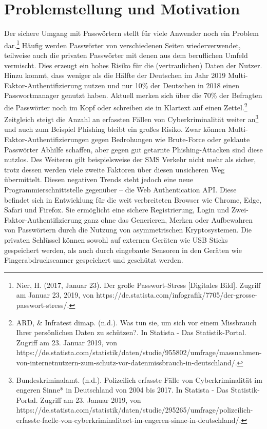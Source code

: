 \chapter{Problemstellung und Motivation}

Der sichere Umgang mit Passwörtern stellt für viele Anwender noch ein Problem dar.\footnote{Nier, H. (2017, Januar 23). Der große Passwort-Stress [Digitales Bild]. Zugriff am Januar 23, 2019, von https://de.statista.com/infografik/7705/der-grosse-passwort-stress/.} Häufig werden Passwörter von verschiedenen Seiten wiederverwendet, teilweise auch die privaten Passwörter mit denen aus dem beruflichen Umfeld vermischt. Dies erzeugt ein hohes Risiko für die (vertraulichen) Daten der Nutzer. Hinzu kommt, dass weniger als die Hälfte der Deutschen im Jahr 2019 Multi-Faktor-Authentifizierung nutzen und nur 10\% der Deutschen in 2018 einen Passwortmanager genutzt haben. Aktuell merken sich über die 70\% der Befragten die Passwörter noch im Kopf oder schreiben sie in Klartext auf einen Zettel.\footnote{ARD, \& Infratest dimap. (n.d.). Was tun sie, um sich vor einem Missbrauch Ihrer persönlichen Daten zu schützen?. In Statista - Das Statistik-Portal. Zugriff am 23. Januar 2019, von https://de.statista.com/statistik/daten/studie/955802/umfrage/massnahmen-von-internetnutzern-zum-schutz-vor-datenmissbrauch-in-deutschland/.}\\
Zeitgleich steigt die Anzahl an erfassten Fällen von Cyberkriminalität weiter an\footnote{Bundeskriminalamt. (n.d.). Polizeilich erfasste Fälle von Cyberkriminalität im engeren Sinne* in Deutschland von 2004 bis 2017. In Statista - Das Statistik-Portal. Zugriff am 23. Januar 2019, von https://de.statista.com/statistik/daten/studie/295265/umfrage/polizeilich-erfasste-faelle-von-cyberkriminalitaet-im-engeren-sinne-in-deutschland/.
} und auch zum Beispiel Phishing bleibt ein großes Risiko. Zwar können Multi-Faktor-Authentifizierungen gegen Bedrohungen wie Brute-Force oder geklaute Passwörter Abhilfe schaffen, aber gegen gut getarnte Phishing-Attacken sind diese nutzlos. Des Weiteren gilt beispielsweise der SMS Verkehr nicht mehr als sicher, trotz dessen werden viele zweite Faktoren über diesen unsicheren Weg übermittelt.
Diesen negativen Trends steht jedoch eine neue Programmierschnittstelle gegenüber -- die Web Authentication API. Diese befindet sich in Entwicklung für die weit verbreiteten Browser wie Chrome, Edge, Safari und Firefox. Sie ermöglicht eine sichere Registrierung, Login und Zwei-Faktor-Authentifizierung ganz ohne das Generieren, Merken oder Aufbewahren von Passwörtern durch die Nutzung von asymmetrischen Kryptosystemen. Die privaten Schlüssel können sowohl auf externen Geräten wie USB Sticks gespeichert werden, als auch durch eingebaute Sensoren in den Geräten wie Fingerabdruckscanner gespeichert und geschützt werden.